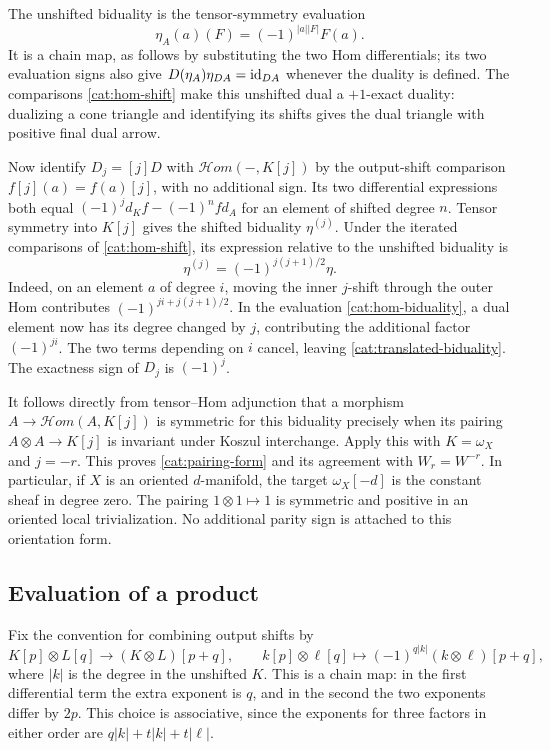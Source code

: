 The unshifted biduality is the tensor-symmetry evaluation
\begin{equation}
 \label{cat:hom-biduality}
 \eta_A(a)(F)=(-1)^{|a||F|}F(a).
\end{equation}
It is a chain map, as follows by substituting the two Hom differentials;
its two evaluation signs also give
$D(\eta_A)\eta_{DA}=\mathrm{id}_{DA}$ whenever the duality is defined.
The comparisons \eqref{cat:hom-shift} make this unshifted dual a
$+1$-exact duality: dualizing a cone triangle and identifying its shifts
gives the dual triangle with positive final dual arrow.

Now identify $D_j=[j]D$ with $\mathcal Hom(-,K[j])$ by the output-shift
comparison $f[j](a)=f(a)[j]$, with no additional sign. Its two
differential expressions both equal
$(-1)^j d_Kf-(-1)^n f d_A$ for an element of shifted degree $n$.
Tensor symmetry into $K[j]$ gives the shifted biduality
$\eta^{(j)}$.  Under the iterated comparisons of
\eqref{cat:hom-shift}, its expression relative to the unshifted
biduality is
\begin{equation}
 \label{cat:translated-biduality}
 \eta^{(j)}=(-1)^{j(j+1)/2}\eta.
\end{equation}
Indeed, on an element $a$ of degree $i$, moving the inner $j$-shift
through the outer Hom contributes
$(-1)^{ji+j(j+1)/2}$.  In the evaluation
\eqref{cat:hom-biduality}, a dual element now has its degree changed
by $j$, contributing the additional factor $(-1)^{ji}$.  The two
terms depending on $i$ cancel, leaving
\eqref{cat:translated-biduality}.  The exactness sign of $D_j$ is
$(-1)^j$.

It follows directly from tensor--Hom adjunction that a morphism
$A\to\mathcal Hom(A,K[j])$ is symmetric for this biduality precisely
when its pairing $A\otimes A\to K[j]$ is invariant under Koszul
interchange.  Apply this with $K=\omega_X$ and $j=-r$.  This proves
\eqref{cat:pairing-form} and its agreement with $W_r=W^{-r}$.
In particular, if $X$ is an oriented $d$-manifold, the target
$\omega_X[-d]$ is the constant sheaf in degree zero.  The pairing
$1\otimes1\mapsto1$ is symmetric and positive in an oriented local
trivialization.  No additional parity sign is attached to this
orientation form.

\subsection{Evaluation of a product}

Fix the convention for combining output shifts by
\begin{equation}
 \label{cat:tensor-output-shifts}
 K[p]\otimes L[q]\longrightarrow(K\otimes L)[p+q],
 \qquad k[p]\otimes\ell[q]\longmapsto
 (-1)^{q|k|}(k\otimes\ell)[p+q],
\end{equation}
where $|k|$ is the degree in the unshifted $K$.  This is a chain map:
in the first differential term the extra exponent is $q$, and in the
second the two exponents differ by $2p$.  This choice is associative,
since the exponents for three factors in either order are
$q|k|+t|k|+t|\ell|$.

